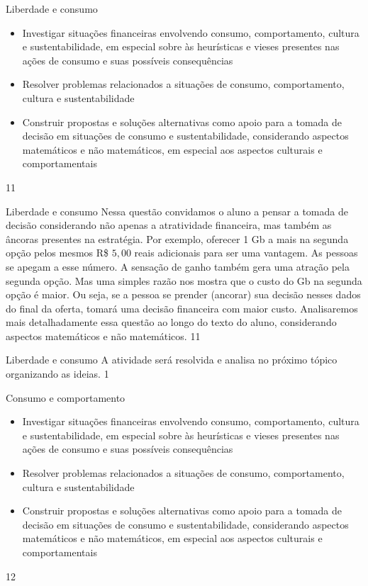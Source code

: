 \def\currentcolor{session1}
\begin{objectives}{Liberdade e consumo}
{
\begin{itemize}
\item Investigar situações financeiras envolvendo consumo, comportamento, cultura e sustentabilidade, em especial sobre às heurísticas e vieses presentes nas ações de consumo e suas possíveis consequências
\item Resolver problemas relacionados a situações de consumo, comportamento, cultura e sustentabilidade
\item Construir propostas e soluções alternativas como apoio para a tomada de decisão em situações de consumo e sustentabilidade, considerando aspectos matemáticos e não matemáticos, em especial aos aspectos culturais e comportamentais
\end{itemize}
}{1}{1}
\end{objectives}
\begin{sugestions}{Liberdade e consumo}
{
Nessa questão convidamos o aluno a pensar a tomada de decisão considerando não apenas a atratividade financeira, mas também as âncoras presentes na estratégia. Por exemplo, oferecer 1 Gb a mais na segunda opção pelos mesmos R\$ $5{,}00$ reais adicionais para ser uma vantagem. As pessoas se apegam a esse número. A sensação de ganho também gera uma atração pela segunda opção. Mas uma simples razão nos mostra que o custo do Gb na segunda opção é maior. Ou seja, se a pessoa se prender (ancorar) sua decisão nesses dados do final da oferta, tomará uma decisão financeira com maior custo. 
Analisaremos mais detalhadamente essa questão ao longo do texto do aluno, considerando aspectos matemáticos e não matemáticos. 
}{1}{1}
\end{sugestions}
\begin{answer}{Liberdade e consumo}
{
A atividade será resolvida e analisa no próximo tópico organizando as ideias.
}{1}
\end{answer}
\clearmargin
\begin{objectives}{Consumo e comportamento}
{
\begin{itemize}
\item Investigar situações financeiras envolvendo consumo, comportamento, cultura e sustentabilidade, em especial sobre às heurísticas e vieses presentes nas ações de consumo e suas possíveis consequências
\item Resolver problemas relacionados a situações de consumo, comportamento, cultura e sustentabilidade
\item Construir propostas e soluções alternativas como apoio para a tomada de decisão em situações de consumo e sustentabilidade, considerando aspectos matemáticos e não matemáticos, em especial aos aspectos culturais e comportamentais
\end{itemize}
}{1}{2}
\end{objectives}
